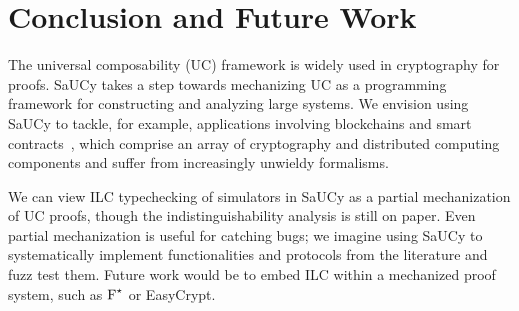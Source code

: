 \section{Conclusion and Future Work}
\label{sec:conclusion}

The universal composability (UC) framework is widely used in cryptography
for proofs.
SaUCy takes a step towards mechanizing UC as a programming
framework for constructing and analyzing large systems.
%
%
We envision using SaUCy to tackle, for example, applications involving blockchains and smart contracts~\cite{dziembowski2018general,miller2017sprites,dziembowski2017perun}, which comprise an array of cryptography and distributed computing components and suffer from increasingly unwieldy formalisms.

We can view ILC typechecking of simulators in SaUCy as a partial
mechanization of UC proofs, though the indistinguishability analysis
is still on paper.
Even partial mechanization is useful for catching
bugs; we imagine using SaUCy to systematically implement
functionalities and protocols from the literature and fuzz test
them.
Future work would be to embed ILC within a mechanized proof system,
such as $\textnormal{F}^{\star}$ or EasyCrypt.

